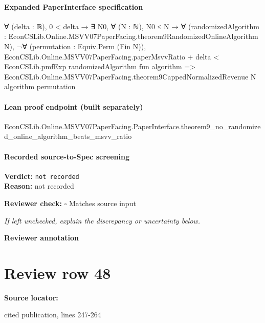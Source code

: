 \documentclass[10pt]{article}
\newcommand{\reviewerbox}{%
  \par\noindent\fbox{\parbox{0.96\linewidth}{\rule{0pt}{0.38in}}}\par
}
\newcommand{\reviewmatch}[1]{%
  \par\noindent\textbf{Reviewer check:} $\square$\; #1\par
  \noindent\emph{If left unchecked, explain the discrepancy or uncertainty below.}\par
}
\begin{document}
\paragraph{Expanded PaperInterface specification}
\begin{ReviewVerbatim}
∀ (delta : ℝ),
  0 < delta →
    ∃ N0,
      ∀ (N : ℕ),
        N0 ≤ N →
          ∀ (randomizedAlgorithm : EconCSLib.Online.MSVV07PaperFacing.theorem9RandomizedOnlineAlgorithm N),
            ¬∀ (permutation : Equiv.Perm (Fin N)),
                EconCSLib.Online.MSVV07PaperFacing.paperMsvvRatio + delta <
                  EconCSLib.pmfExp randomizedAlgorithm fun algorithm =>
                    EconCSLib.Online.MSVV07PaperFacing.theorem9CappedNormalizedRevenue N algorithm permutation
\end{ReviewVerbatim}

\paragraph{Lean proof endpoint (built separately)}\begin{ReviewVerbatim}
EconCSLib.Online.MSVV07PaperFacing.PaperInterface.theorem9_no_randomized_online_algorithm_beats_msvv_ratio
\end{ReviewVerbatim}

\paragraph{Recorded source-to-Spec screening}
\textbf{Verdict:} \texttt{not recorded}
\\
\textbf{Reason:} not recorded
\reviewmatch{Matches source input}
\noindent\textbf{Reviewer annotation}\par
\reviewerbox
\clearpage
\hypertarget{source-claim-b801ff921ee99322}{}
\section*{Review row 48}
\textbf{Source locator:} {\footnotesize\raggedright cited publication, lines 247-\allowbreak{}264\par}
\end{document}
